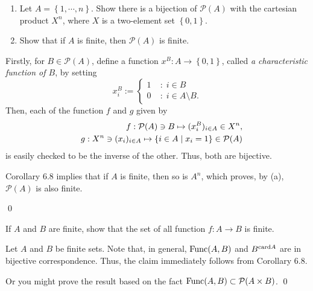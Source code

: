 \documentclass[a4paper,12pt]{article}
\begin{document}
\begin{exe}\leavevmode \par
	\begin{enumerate}
		\item
		      Let \( A=\left\{ 1,\cdots,n \right\} \).
		      Show there is a bijection of \( \mathcal{P}(A) \)
		      with the cartesian product \( X^{n} \),
		      where \( X \) is a two-element set \( \left\{ 0,1 \right\} \).
		      
		\item
		      Show that if \( A \) is finite, then \( \mathcal{P}(A) \) is finite.
	\end{enumerate}
\end{exe}\begin{sol}\leavevmode \par
	Firstly, for \( B \in \mathcal{P}(A) \),
	define a function \( x^B:A \to \left\{ 0,1 \right\}\),
	called \textit{a characteristic function of \( B \)}, by setting
	\begin{equation*}
		x^B_i:=\begin{cases}
			1 & \;\mathrm{:}\;i \in B             \\
			0 & \;\mathrm{:}\;i \in A\setminus B.
		\end{cases}
	\end{equation*}
	Then, each of the function \( f \) and \( g \) given by
	\begin{eqnarray*}
		&&f:\mathcal{P}(A) \ni B \mapsto (x^B_i)_{i \in A}\in X^{n},\\
		&&g:X^{n} \ni (x_i)_{i \in A}
		\mapsto
		\left\{ i\in A \;|\; x_i=1 \right\} \in \mathcal{P}(A)
	\end{eqnarray*}
	is easily checked to be the inverse of the other.
	Thus, both are bijective.
	
	Corollary 6.8 implies that if \( A \) is finite, then so is \( A^n \),
	which proves, by (a), \( \mathcal{P}(A) \) is also finite.
	
	\qed\end{sol}

\begin{exe}
	If \( A \) and \( B \) are finite, show that the set of all function
	\( f:A\to B \)
	is finite.
\end{exe}\begin{sol}
	Let \( A \) and \( B \) be finite sets.
	Note that, in general,
	\( \mathrm{Func}(A,B) \)
	and 
	\(B^{\mathrm{card}A} \)
	are in bijective correspondence.
	Thus, the claim immediately follows from Corollary 6.8.
	
	Or you might prove the result based on the fact
	\( \mathrm{Func}(A,B) \subset \mathcal{P}(A \times B) \).
	\qed\end{sol}
\end{document}
